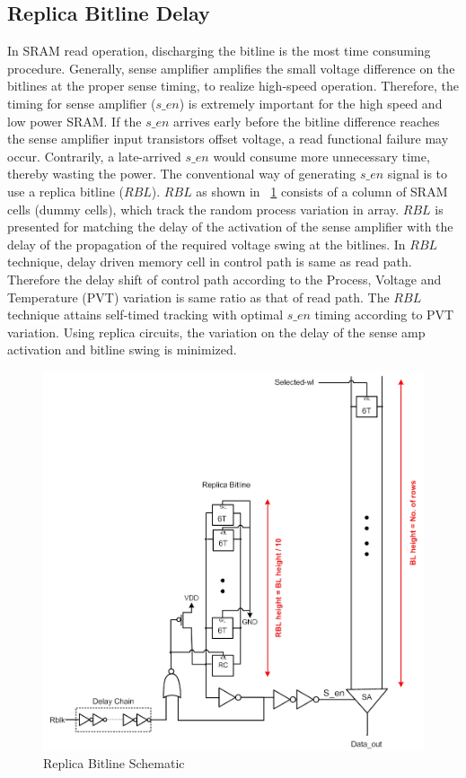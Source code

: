 	 
\subsection{Replica Bitline Delay}
\label{sec:RBL}


	 
In SRAM read operation, discharging the bitline is the most time consuming procedure. 
Generally, sense amplifier amplifies the small voltage difference on the bitlines at the proper sense timing, 
to realize high-speed operation. Therefore, the timing for sense amplifier ($s\_en$) is extremely important for the high speed and low power SRAM. 
If the $s\_en$ arrives early before the bitline difference reaches the sense amplifier input transistors offset voltage, 
a read functional failure may occur. Contrarily, a late-arrived $s\_en$ would consume more unnecessary time, thereby wasting the power. 
The conventional way of generating $s\_en$ signal is to use a replica bitline ($RBL$). $RBL$ as shown in ~\ref{fig:RBL} consists of a column of SRAM cells (dummy cells), 
which track the random process variation in array. $RBL$ is presented for matching the delay of the activation of the 
sense amplifier with the delay of the propagation of the required voltage swing at the bitlines. 
In $RBL$ technique, delay driven memory cell in control path is same as read path. Therefore the 
delay shift of control path according to the Process, Voltage and Temperature (PVT) variation is same ratio as that of read path. 
The $RBL$ technique attains self-timed tracking with optimal $s\_en$ timing according to PVT variation. 
Using replica circuits, the variation on the delay of the sense amp activation and bitline swing is minimized.

\begin{figure}[h!]
\centering
\includegraphics[scale=.9]{./figs/replica_bitline.pdf}
\caption{Replica Bitline Schematic}
\label{fig:RBL}
\end{figure}
 
